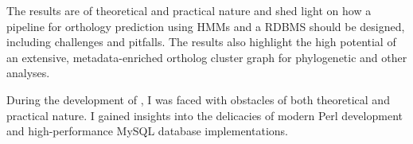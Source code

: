 The results are of theoretical and practical nature and shed light on how a
pipeline for orthology prediction using HMMs and a RDBMS should be designed,
including challenges and pitfalls. 
The results also highlight the high potential of an extensive, metadata-enriched
ortholog cluster graph for phylogenetic and other analyses. 

During the development of \pname, I was faced with obstacles of both theoretical
and practical nature. I gained insights into the delicacies of modern Perl
development and high-performance MySQL database implementations.
